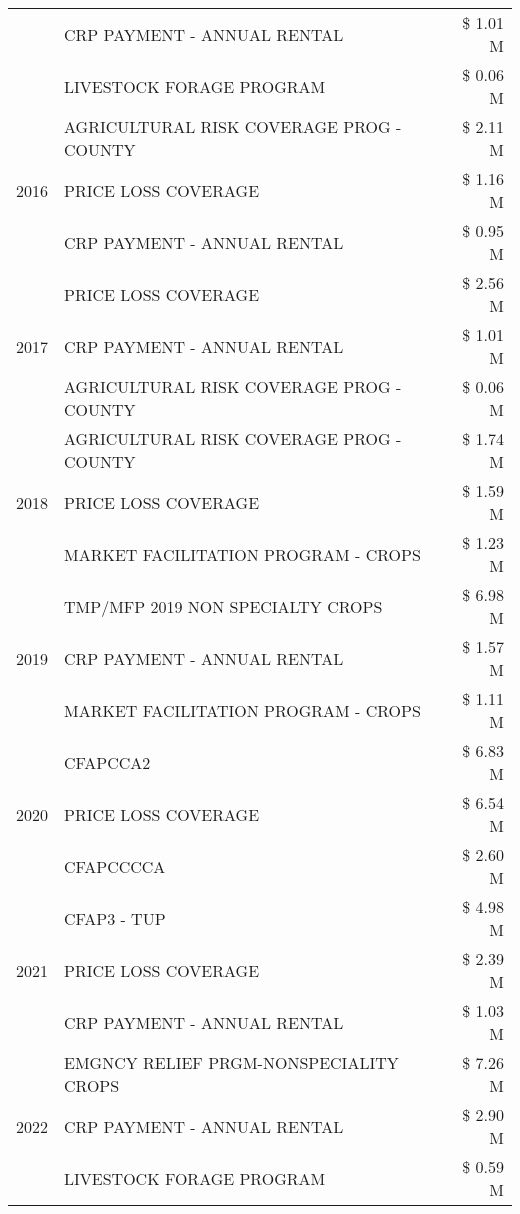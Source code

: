 \begin{tabular}{llr}
 & CRP PAYMENT - ANNUAL RENTAL & \$ 1.01 M \\
 & LIVESTOCK FORAGE PROGRAM & \$ 0.06 M \\
\cline{1-3}
\multirow[t]{3}{*}{2016} & AGRICULTURAL RISK COVERAGE PROG - COUNTY & \$ 2.11 M \\
 & PRICE LOSS COVERAGE & \$ 1.16 M \\
 & CRP PAYMENT - ANNUAL RENTAL & \$ 0.95 M \\
\cline{1-3}
\multirow[t]{3}{*}{2017} & PRICE LOSS COVERAGE & \$ 2.56 M \\
 & CRP PAYMENT - ANNUAL RENTAL & \$ 1.01 M \\
 & AGRICULTURAL RISK COVERAGE PROG - COUNTY & \$ 0.06 M \\
\cline{1-3}
\multirow[t]{3}{*}{2018} & AGRICULTURAL RISK COVERAGE PROG - COUNTY & \$ 1.74 M \\
 & PRICE LOSS COVERAGE & \$ 1.59 M \\
 & MARKET FACILITATION PROGRAM - CROPS & \$ 1.23 M \\
\cline{1-3}
\multirow[t]{3}{*}{2019} & TMP/MFP 2019 NON SPECIALTY CROPS & \$ 6.98 M \\
 & CRP PAYMENT - ANNUAL RENTAL & \$ 1.57 M \\
 & MARKET FACILITATION PROGRAM - CROPS & \$ 1.11 M \\
\cline{1-3}
\multirow[t]{3}{*}{2020} & CFAPCCA2 & \$ 6.83 M \\
 & PRICE LOSS COVERAGE & \$ 6.54 M \\
 & CFAPCCCCA & \$ 2.60 M \\
\cline{1-3}
\multirow[t]{3}{*}{2021} & CFAP3 - TUP & \$ 4.98 M \\
 & PRICE LOSS COVERAGE & \$ 2.39 M \\
 & CRP PAYMENT - ANNUAL RENTAL & \$ 1.03 M \\
\cline{1-3}
\multirow[t]{3}{*}{2022} & EMGNCY RELIEF PRGM-NONSPECIALITY CROPS & \$ 7.26 M \\
 & CRP PAYMENT - ANNUAL RENTAL & \$ 2.90 M \\
 & LIVESTOCK FORAGE PROGRAM & \$ 0.59 M \\
\cline{1-3}
\bottomrule
\end{tabular}
